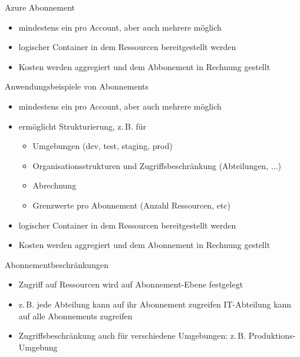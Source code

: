 
\begin{flashcard}[Describe]{Azure Abonnement}
    \begin{itemize}
        \item mindestens ein pro Account, aber auch mehrere möglich
        \item logischer Container in dem Ressourcen bereitgestellt werden
        \item Kosten werden aggregiert und dem Abbonement in Rechnung gestellt
    \end{itemize}
\end{flashcard}

\begin{flashcard}[\ ]{Anwendungsbeispiele von Abonnements}
    \begin{itemize}
        \item mindestens ein pro Account, aber auch mehrere möglich
        \item ermöglicht Strukturierung, z.\,B. für
        \begin{itemize}
            \item Umgebungen (dev, test, staging, prod)
            \item Organisationsstrukturen und Zugriffsbeschränkung (Abteilungen, ...)
            \item Abrechnung
            \item Grenzwerte pro Abonnement (Anzahl Ressourcen, etc)
        \end{itemize}
        \item logischer Container in dem Ressourcen bereitgestellt werden
        \item Kosten werden aggregiert und dem Abonnement in Rechnung gestellt
    \end{itemize}
\end{flashcard}

\begin{flashcard}[\ ]{Abonnementbeschränkungen}
    \begin{itemize}
        \item Zugriff auf Ressourcen wird auf Abonnement-Ebene festgelegt
        \item z.\,B. jede Abteilung kann auf ihr Abonnement zugreifen\newline
        IT-Abteilung kann auf alle Abonnements zugreifen
        \item Zugriffsbeschränkung auch für verschiedene Umgebungen:\newline
        z.\,B. Produktions-Umgebung
    \end{itemize}
\end{flashcard}

